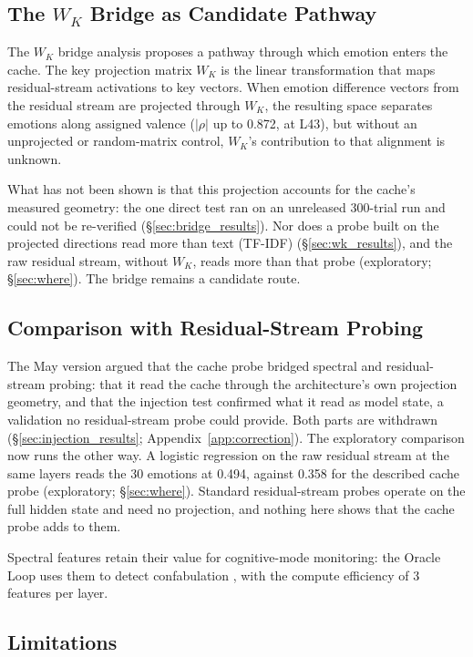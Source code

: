\subsection{The $W_K$ Bridge as Candidate Pathway}

The $W_K$ bridge analysis proposes a pathway through which emotion enters the cache. The key projection matrix $W_K$ is the linear transformation that maps residual-stream activations to key vectors. When emotion difference vectors from the residual stream are projected through $W_K$, the resulting space separates emotions along assigned valence ($|\rho|$ up to 0.872, at L43), but without an unprojected or random-matrix control, $W_K$'s contribution to that alignment is unknown.

What has not been shown is that this projection accounts for the cache's measured geometry: the one direct test ran on an unreleased 300-trial run and could not be re-verified (\S\ref{sec:bridge_results}). Nor does a probe built on the projected directions read more than text (TF-IDF) (\S\ref{sec:wk_results}), and the raw residual stream, without $W_K$, reads more than that probe (exploratory; \S\ref{sec:where}). The bridge remains a candidate route.

\subsection{Comparison with Residual-Stream Probing}

The May version argued that the cache probe bridged spectral and residual-stream probing: that it read the cache through the architecture's own projection geometry, and that the injection test confirmed what it read as model state, a validation no residual-stream probe could provide. Both parts are withdrawn (\S\ref{sec:injection_results}; Appendix~\ref{app:correction}). The exploratory comparison now runs the other way. A logistic regression on the raw residual stream at the same layers reads the 30 emotions at 0.494, against 0.358 for the described cache probe (exploratory; \S\ref{sec:where}). Standard residual-stream probes operate on the full hidden state and need no projection, and nothing here shows that the cache probe adds to them.

Spectral features retain their value for cognitive-mode monitoring: the Oracle Loop uses them to detect confabulation \citep{lyra2026oracle}, with the compute efficiency of 3 features per layer.

\subsection{Limitations}
\label{sec:limitations}

